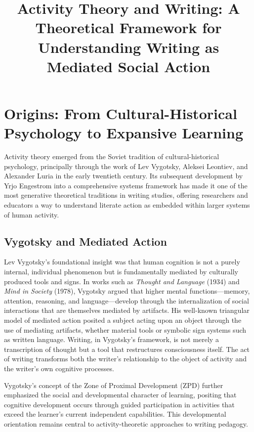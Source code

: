 \documentclass[12pt]{article}
\title{Activity Theory and Writing: A Theoretical Framework for Understanding Writing as Mediated Social Action}
\author{}
\date{}
\begin{document}
\maketitle

\section{Origins: From Cultural-Historical Psychology to Expansive Learning}

Activity theory emerged from the Soviet tradition of cultural-historical psychology, principally through the work of Lev Vygotsky, Aleksei Leontiev, and Alexander Luria in the early twentieth century. Its subsequent development by Yrjo Engestrom into a comprehensive systems framework has made it one of the most generative theoretical traditions in writing studies, offering researchers and educators a way to understand literate action as embedded within larger systems of human activity.

\subsection{Vygotsky and Mediated Action}

Lev Vygotsky's foundational insight was that human cognition is not a purely internal, individual phenomenon but is fundamentally mediated by culturally produced tools and signs. In works such as \textit{Thought and Language} (1934) and \textit{Mind in Society} (1978), Vygotsky argued that higher mental functions---memory, attention, reasoning, and language---develop through the internalization of social interactions that are themselves mediated by artifacts. His well-known triangular model of mediated action posited a subject acting upon an object through the use of mediating artifacts, whether material tools or symbolic sign systems such as written language. Writing, in Vygotsky's framework, is not merely a transcription of thought but a tool that restructures consciousness itself. The act of writing transforms both the writer's relationship to the object of activity and the writer's own cognitive processes.

Vygotsky's concept of the Zone of Proximal Development (ZPD) further emphasized the social and developmental character of learning, positing that cognitive development occurs through guided participation in activities that exceed the learner's current independent capabilities. This developmental orientation remains central to activity-theoretic approaches to writing pedagogy.
\end{document}

